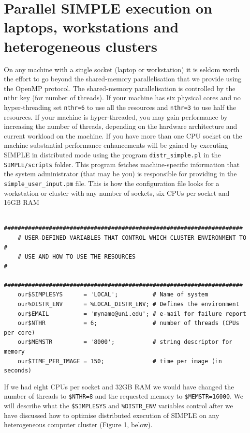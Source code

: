 \documentclass[a4paper,11pt]{article}
\newcommand{\prgname}[1]{\textcolor{NavyBlue}{\texttt{#1}}}
\begin{document}
\section{Parallel SIMPLE execution on laptops, workstations and heterogeneous clusters}
\label{paraexec}
On any machine with a single socket (laptop or workstation) it is seldom worth the effort to go beyond the shared-memory parallelisation that we provide using the OpenMP protocol. The shared-memory parallelisation is controlled by the \texttt{nthr} key (for number of threads). If your machine has six physical cores and no hyper-threading set \texttt{nthr=6} to use all the resources and \texttt{nthr=3} to use half the resources. If your machine is hyper-threaded, you may gain performance by increasing the number of threads, depending on the hardware architecture and current workload on the machine. If you have more than one CPU socket on the machine substantial performance enhancements will be gained by executing SIMPLE in distributed mode using the program \prgname{distr\_simple.pl} in the \texttt{SIMPLE/scripts} folder. This program fetches machine-specific information that the system administrator (that may be you) is responsible for providing in the \texttt{simple\_user\_input.pm} file. This is how the configuration file looks for a workstation or cluster with any number of sockets, six CPUs per socket and 16GB RAM
\begin{verbatim}
    #####################################################################
    # USER-DEFINED VARIABLES THAT CONTROL WHICH CLUSTER ENVIRONMENT TO  #
    # USE AND HOW TO USE THE RESOURCES                                  #
    #####################################################################
    our$SIMPLESYS      = 'LOCAL';          # Name of system
    our%DISTR_ENV      = %LOCAL_DISTR_ENV; # Defines the environment     
    our$EMAIL          = 'myname@uni.edu'; # e-mail for failure report
    our$NTHR           = 6;                # number of threads (CPUs per core)
    our$MEMSTR         = '8000';           # string descriptor for memory
    our$TIME_PER_IMAGE = 150;              # time per image (in seconds)
\end{verbatim}
If we had eight CPUs per socket and 32GB RAM we would have changed the number of threads to \texttt{\$NTHR=8} and the requested memory to \texttt{\$MEMSTR=16000}. We will describe what the \texttt{\$SIMPLESYS} and \texttt{\%DISTR\_ENV} variables control after we have discussed how to optimise distributed execution of SIMPLE on any heterogeneous computer cluster (Figure 1, below). 
\end{document}

